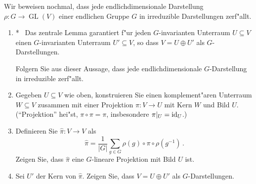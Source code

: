 \documentclass[a4,11pt]{article}
\newcommand{\bonusitem}{\item\hspace*{-2.4mm}*\ }
\begin{document}
\vspace*{-17mm}
{
\kopf
}



\begin{aufgabe}[4 Punkte]
  Wir beweisen nochmal, dass jede endlichdimensionale Darstellung
  $\rho \colon G \to \operatorname{GL}(V)$ einer endlichen Gruppe $G$ in irreduzible
  Darstellungen zerf"allt.
\begin{enumerate}
\addtocounter{enumi}{-1}
\bonusitem
Das zentrale Lemma garantiert f"ur jeden $G$-invarianten Unterraum $U
\subseteq V$ einen $G$-invarianten Unterraum $U' \subseteq V$, so dass
$V = U \oplus U'$ als $G$-Darstellungen.

Folgern Sie aus dieser Aussage, dass jede endlichdimensionale
$G$-Darstellung in irreduzible zerf"allt.
\item Gegeben $U \subseteq V$ wie oben, konstruieren Sie einen
  komplement"aren Unterraum $W \subseteq V$ zusammen mit einer
  Projektion $\pi \colon V \to U$ mit Kern $W$ und Bild
  $U$. ("`Projektion"' hei"st, $\pi \circ \pi = \pi$, insbesondere
  $\pi|_U = {\rm id}_U$.)
\item Definieren Sie $\hat \pi \colon V \to V$ als
  $$
  \hat \pi = \frac{1}{|G|} \sum_{g \in G} \rho(g) \circ \pi \circ \rho(g^{-1}) \,.
  $$
  Zeigen Sie, dass $\hat \pi$ eine $G$-lineare Projektion mit Bild $U$ ist.
\item Sei $U'$ der Kern von $\hat \pi$. Zeigen Sie, dass $V = U \oplus
  U'$ als $G$-Darstellungen.
  \end{enumerate}
\end{aufgabe}
\end{document}
